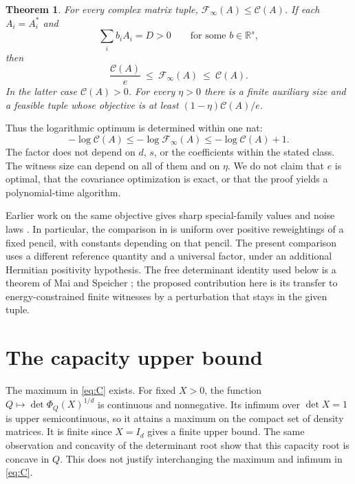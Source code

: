\documentclass[11pt]{article}
\newtheorem{theorem}{Theorem}
\newcommand{\R}{\mathbb R}
\newcommand{\F}{\mathcal F}
\newcommand{\K}{\mathcal C}
\begin{document}
\begin{theorem}\label{thm:main}
For every complex matrix tuple, $\F_\infty(A)\le\K(A)$. If each $A_i=A_i^*$ and
\[
 \sum_i b_iA_i=D>0\qquad\text{for some }b\in\R^s,
\]
then
\begin{equation}\label{eq:main}
 \frac{\K(A)}{e}\ \le\ \F_\infty(A)\ \le\ \K(A).
\end{equation}
In the latter case $\K(A)>0$. For every $\eta>0$ there is a finite auxiliary size and a feasible tuple whose objective is at least $(1-\eta)\K(A)/e$.
\end{theorem}

Thus the logarithmic optimum is determined within one nat:
\[
 -\log\K(A)\le-\log\F_\infty(A)\le-\log\K(A)+1.
\]
The factor does not depend on $d$, $s$, or the coefficients within the stated class. The witness size can depend on all of them and on $\eta$. We do not claim that $e$ is optimal, that the covariance optimization is exact, or that the proof yields a polynomial-time algorithm.

Earlier work on the same objective gives sharp special-family values and noise laws \cite{sharp,tropical}. In particular, the comparison in \cite{tropical} is uniform over positive reweightings of a fixed pencil, with constants depending on that pencil. The present comparison uses a different reference quantity and a universal factor, under an additional Hermitian positivity hypothesis. The free determinant identity used below is a theorem of Mai and Speicher \cite{ms}; the proposed contribution here is its transfer to energy-constrained finite witnesses by a perturbation that stays in the given tuple.

\section{The capacity upper bound}
The maximum in \eqref{eq:C} exists. For fixed $X>0$, the function $Q\mapsto\det\Phi_Q(X)^{1/d}$ is continuous and nonnegative. Its infimum over $\det X=1$ is upper semicontinuous, so it attains a maximum on the compact set of density matrices. It is finite since $X=I_d$ gives a finite upper bound. The same observation and concavity of the determinant root show that this capacity root is concave in $Q$. This does not justify interchanging the maximum and infimum in \eqref{eq:C}.
\end{document}
